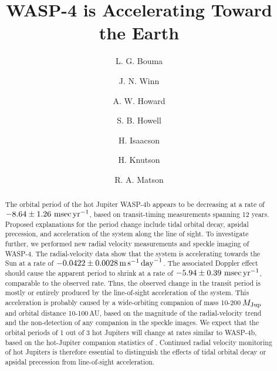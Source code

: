 \documentclass[12pt,twocolumn,tighten,trackchanges]{aastex62}
\begin{document}

\title{WASP-4 is Accelerating Toward the Earth}


%
%
\author[0000-0002-0514-5538]{L. G. Bouma}
%
\author[0000-0002-4265-047X]{J. N. Winn}

%
%
\author[0000-0001-8638-0320]{A. W. Howard}
%
\author[0000-0002-2532-2853]{S. B. Howell}
%
\author[0000-0002-0531-1073]{H. Isaacson}
%
\author{H. Knutson}
%
\author[0000-0001-7233-7508]{R. A. Matson}
%

\begin{abstract}
  The orbital period of the hot Jupiter WASP-4b appears to be
  decreasing at a rate of $-8.64 \pm 1.26~{\rm msec}\,{\rm yr}^{-1}$,
  based on transit-timing measurements spanning 12 years.  Proposed
  explanations for the period change include tidal orbital decay,
  apsidal precession, and acceleration of the system along the line of
  sight.  To investigate further, we performed new radial velocity
  measurements and speckle imaging of WASP-4.  The radial-velocity
  data show that the system is accelerating towards the Sun at a rate
  of $-0.0422\pm 0.0028\,{\rm m}\,{\rm s}^{-1}\,{\rm day}^{-1}$.  The
  associated Doppler effect should cause the apparent period to shrink
  at a rate of $-5.94 \pm 0.39~{\rm msec}\,{\rm yr}^{-1}$, comparable
  to the observed rate.  Thus, the observed change in the transit
  period is mostly or entirely produced by the line-of-sight
  acceleration of the system.  This acceleration is probably caused by
  a wide-orbiting companion of mass 10-200$\,M_{\rm Jup}$ and orbital
  distance 10-100$\,$AU, based on the magnitude of the radial-velocity
  trend and the non-detection of any companion in the speckle images.
  We expect that the orbital periods of 1 out of 3 hot Jupiters will
  change at rates similar to WASP-4b, based on the hot-Jupiter
  companion statistics of \citet{knutson_friends_2014}.
  Continued radial velocity monitoring of hot Jupiters is therefore
  essential to distinguish the effects of tidal orbital decay or
  apsidal precession from line-of-sight acceleration.
\end{abstract}
\end{document}
